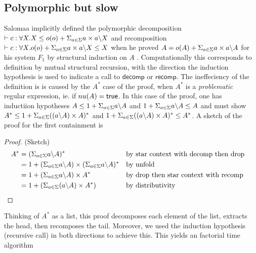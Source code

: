 \documentclass[a4paper,UKenglish,cleveref, autoref, thm-restate]{lipics-v2021}
\newcommand\mycomment[1]{}
\begin{document}
\subsection{Polymorphic but slow}
Salomaa implicitly defined the polymorphic decomposition $\contains{}{c}{\forall X. X}{\myo{o} + \decomp{X}}$ and recomposition $\contains{}{c}{\forall X.\myo{o} + \decomp{X}}{X}$ when he proved $A = o(A) + \Sigma_{a \in \Sigma} a\times a \backslash A$ for his system $F_1$ by structural induction on $A$ \mycomment{is that the right name of system?}. Computationally this corresponds to definition by mutual structural recursion, with the direction the induction hypothesis is used to indicate a call to $\mathsf{decomp}$ or $\mathsf{recomp}$. The ineffeciency of the definition is is caused by the $A^*$ case of the proof, when  $A^*$ is a \textit{problematic} regular expression, ie. if $\mynu{A} = \textsf{true}$. In this case of the proof, one has inductiion hypotheses $A \leq 1 + \Sigma_{a \in \Sigma} a \backslash A$ and  $1 + \Sigma_{a \in \Sigma} a \backslash A \leq A$ and must show $A^* \leq 1  + \Sigma_{a \in \Sigma} ((a \backslash A)\times A)^*$ and  $1  + \Sigma_{a \in \Sigma} ((a \backslash A)\times A)^* \leq A^*$. A sketch of the proof for the first containment is
\begin{proof} (Sketch)
\begin{align}
A^* &= ( \Sigma_{a \in \Sigma} a \backslash A)^* &&\text{by star context with decomp then drop}\\
 &= 1 + (\Sigma_{a \in \Sigma} a \backslash A) \times (\Sigma_{a \in \Sigma} a \backslash A)^* &&\text{by unfold}\\
 &= 1 + (\Sigma_{a \in \Sigma} a \backslash A) \times A^* && \text{by drop then star context with recomp } \\
 &= 1 + (\Sigma_{a \in \Sigma} (a \backslash A) \times A^*) && \text{by distributivity }
\end{align}
\end{proof}
Thinking of $A^*$ as a list, this proof decomposes each element of the list, extracts the head, then recomposes the tail. Moreover, we used the induction hypothesis (recursive call) in both directions to achieve this. This yields an factorial time algorithm 
\end{document}
